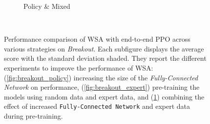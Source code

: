\begin{figure}[ht]
\begin{subfigure}[b]{0.32\textwidth}
        \caption{Policy \& Mixed}
        \label{fig:breakout_expert_policy}
    \end{subfigure}~\caption{Performance comparison of WSA with end-to-end PPO across various strategies on \textit{Breakout}. Each subfigure displays the average score with the standard deviation shaded. They report the different experiments to improve the performance of WSA: (\ref{fig:breakout_policy}) increasing the size of the \textit{Fully-Connected Network} on performance, (\ref{fig:breakout_expert}) pre-training the models using random data and expert data, and (\ref{fig:breakout_expert_policy}) combining the effect of increased \texttt{Fully-Connected Network} and expert data during pre-training.}
    \label{fig:breakout_study}
\end{figure}




